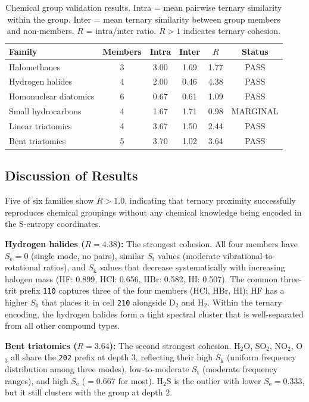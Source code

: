 \documentclass[11pt,twocolumn,a4paper]{article}
\theoremstyle{definition}
\theoremstyle{remark}
\newcommand{\Sk}{S_{\mathrm{k}}}
\newcommand{\St}{S_{\mathrm{t}}}
\newcommand{\Se}{S_{\mathrm{e}}}
\begin{document}
\begin{table}[H]
\centering
\caption{Chemical group validation results. Intra = mean pairwise ternary similarity within the group. Inter = mean ternary similarity between group members and non-members. $R$ = intra/inter ratio. $R > 1$ indicates ternary cohesion.}
\label{tab:validation}
\begin{tabular}{lccccc}
\toprule
Family & Members & Intra & Inter & $R$ & Status \\
\midrule
Halomethanes         & 3 & 3.00 & 1.69 & 1.77 & PASS \\
Hydrogen halides     & 4 & 2.00 & 0.46 & 4.38 & PASS \\
Homonuclear diatomics & 6 & 0.67 & 0.61 & 1.09 & PASS \\
Small hydrocarbons   & 4 & 1.67 & 1.71 & 0.98 & MARGINAL \\
Linear triatomics    & 4 & 3.67 & 1.50 & 2.44 & PASS \\
Bent triatomics      & 5 & 3.70 & 1.02 & 3.64 & PASS \\
\bottomrule
\end{tabular}
\end{table}

\subsection{Discussion of Results}

Five of six families show $R > 1.0$, indicating that ternary proximity successfully reproduces chemical groupings without any chemical knowledge being encoded in the S-entropy coordinates.

\textbf{Hydrogen halides ($R = 4.38$):} The strongest cohesion. All four members have $\Se = 0$ (single mode, no pairs), similar $\St$ values (moderate vibrational-to-rotational ratios), and $\Sk$ values that decrease systematically with increasing halogen mass (HF: 0.899, HCl: 0.656, HBr: 0.582, HI: 0.507). The common three-trit prefix \texttt{110} captures three of the four members (HCl, HBr, HI); HF has a higher $\Sk$ that places it in cell \texttt{210} alongside D$_2$ and H$_2$. Within the ternary encoding, the hydrogen halides form a tight spectral cluster that is well-separated from all other compound types.

\textbf{Bent triatomics ($R = 3.64$):} The second strongest cohesion. H$_2$O, SO$_2$, NO$_2$, O$_3$ all share the \texttt{202} prefix at depth 3, reflecting their high $\Sk$ (uniform frequency distribution among three modes), low-to-moderate $\St$ (moderate frequency ranges), and high $\Se$ ($= 0.667$ for most). H$_2$S is the outlier with lower $\Se = 0.333$, but it still clusters with the group at depth 2.
\end{document}
